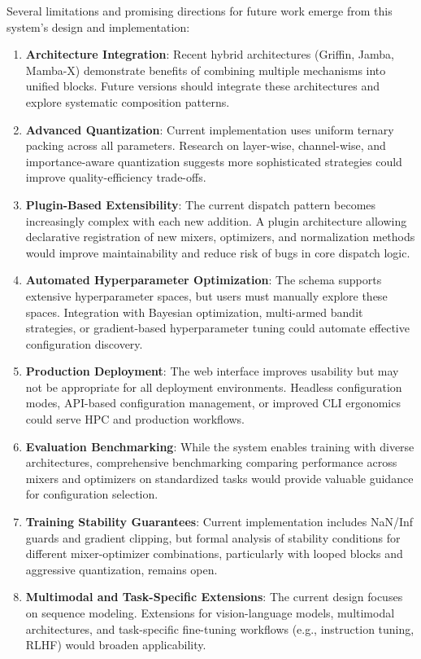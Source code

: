 \documentclass[11pt,a4paper]{article}
\begin{document}
Several limitations and promising directions for future work emerge from this system's design and implementation:

\begin{enumerate}[leftmargin=*]
    \item \textbf{Architecture Integration}: Recent hybrid architectures (Griffin, Jamba, Mamba-X) demonstrate benefits of combining multiple mechanisms into unified blocks. Future versions should integrate these architectures and explore systematic composition patterns.
    
    \item \textbf{Advanced Quantization}: Current implementation uses uniform ternary packing across all parameters. Research on layer-wise, channel-wise, and importance-aware quantization suggests more sophisticated strategies could improve quality-efficiency trade-offs.
    
    \item \textbf{Plugin-Based Extensibility}: The current dispatch pattern becomes increasingly complex with each new addition. A plugin architecture allowing declarative registration of new mixers, optimizers, and normalization methods would improve maintainability and reduce risk of bugs in core dispatch logic.
    
    \item \textbf{Automated Hyperparameter Optimization}: The schema supports extensive hyperparameter spaces, but users must manually explore these spaces. Integration with Bayesian optimization, multi-armed bandit strategies, or gradient-based hyperparameter tuning could automate effective configuration discovery.
    
    \item \textbf{Production Deployment}: The web interface improves usability but may not be appropriate for all deployment environments. Headless configuration modes, API-based configuration management, or improved CLI ergonomics could serve HPC and production workflows.
    
    \item \textbf{Evaluation Benchmarking}: While the system enables training with diverse architectures, comprehensive benchmarking comparing performance across mixers and optimizers on standardized tasks would provide valuable guidance for configuration selection.
    
    \item \textbf{Training Stability Guarantees}: Current implementation includes NaN/Inf guards and gradient clipping, but formal analysis of stability conditions for different mixer-optimizer combinations, particularly with looped blocks and aggressive quantization, remains open.
    
    \item \textbf{Multimodal and Task-Specific Extensions}: The current design focuses on sequence modeling. Extensions for vision-language models, multimodal architectures, and task-specific fine-tuning workflows (e.g., instruction tuning, RLHF) would broaden applicability.
\end{enumerate}
\end{document}
